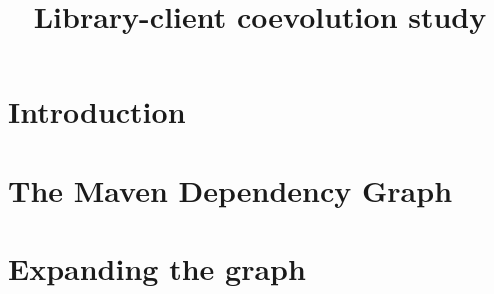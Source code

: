 \documentclass[a4paper,11pt]{article}
\title{Library-client coevolution study}
\author{}
\begin{document}
\section*{Introduction}
\label{sec:introduction}

\section{The Maven Dependency Graph}
\label{sec:maven-depend-graph}

\section{Expanding the graph}
\label{sec:expanding-the-graph}
\end{document}
